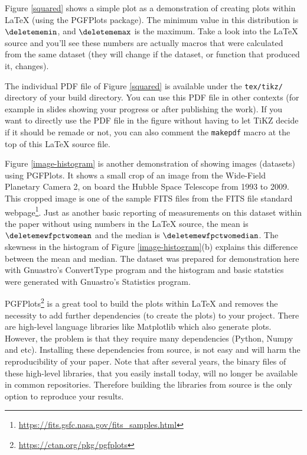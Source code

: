 \documentclass[10pt, twocolumn]{article}
\begin{document}
Figure \ref{squared} shows a simple plot as a demonstration of creating
plots within \LaTeX{} (using the {\small PGFP}lots package). The minimum
value in this distribution is $\deletememin$, and $\deletememax$ is the
maximum. Take a look into the \LaTeX{} source and you'll see these numbers
are actually macros that were calculated from the same dataset (they will
change if the dataset, or function that produced it, changes).

The individual {\small PDF} file of Figure \ref{squared} is available under
the \texttt{tex/tikz/} directory of your build directory. You can use this
PDF file in other contexts (for example in slides showing your progress or
after publishing the work). If you want to directly use the {\small PDF}
file in the figure without having to let {\small T}i{\small KZ} decide if
it should be remade or not, you can also comment the \texttt{makepdf} macro
at the top of this \LaTeX{} source file.

\begin{figure}[t]

\end{figure}

Figure \ref{image-histogram} is another demonstration of showing images
(datasets) using PGFPlots. It shows a small crop of an image from the
Wide-Field Planetary Camera 2, on board the Hubble Space Telescope from
1993 to 2009. This cropped image is one of the sample FITS files from the
FITS file standard
webpage\footnote{\url{https://fits.gsfc.nasa.gov/fits_samples.html}}. Just
as another basic reporting of measurements on this dataset within the paper
without using numbers in the \LaTeX{} source, the mean is
$\deletemewfpctwomean$ and the median is $\deletemewfpctwomedian$. The
skewness in the histogram of Figure \ref{image-histogram}(b) explains this
difference between the mean and median. The dataset was prepared for
demonstration here with Gnuastro's \textsf{Convert\-Type} program and the
histogram and basic statstics were generated with Gnuastro's
\textsf{Statistics} program.

{\small PGFP}lots\footnote{\url{https://ctan.org/pkg/pgfplots}} is a great
tool to build the plots within \LaTeX{} and removes the necessity to add
further dependencies (to create the plots) to your project. There are
high-level language libraries like Matplotlib which also generate
plots. However, the problem is that they require many dependencies (Python,
Numpy and etc). Installing these dependencies from source, is not easy and
will harm the reproducibility of your paper. Note that after several years,
the binary files of these high-level libraries, that you easily install
today, will no longer be available in common repositories. Therefore
building the libraries from source is the only option to reproduce your
results.
\end{document}
